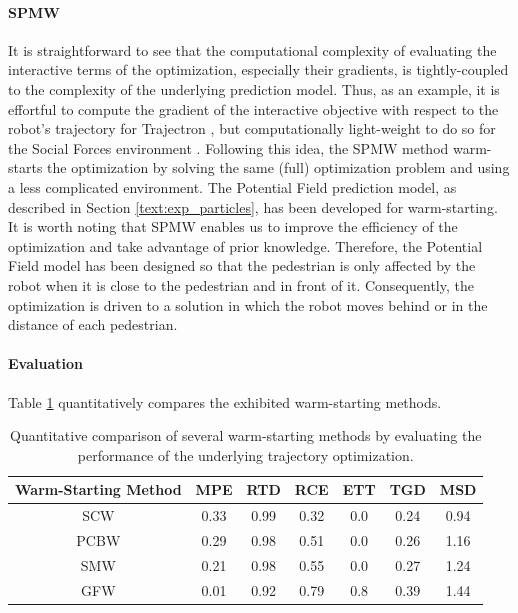 \paragraph{\ac{SPMW}}
It is straightforward to see that the computational complexity of evaluating the interactive terms of the optimization, especially their gradients, is tightly-coupled to the complexity of the underlying prediction model. 
Thus, as an example, it is effortful to compute the gradient of the interactive objective with respect to the robot's trajectory for Trajectron \cite{Ivanovic2018}, but computationally light-weight to do so for the Social Forces environment \cite{Helbing1995}. Following this idea, the \ac{SPMW} method warm-starts the optimization by solving the same (full) optimization problem and using a less complicated environment. The Potential Field prediction model, as described in Section \ref{text:exp_particles}, has been developed for warm-starting. It is worth noting that \ac{SPMW} enables us to improve the efficiency of the optimization and take advantage of prior knowledge. Therefore, the Potential Field model has been designed so that the pedestrian is only affected by the robot when it is close to the pedestrian and in front of it. Consequently, the optimization is driven to a solution in which the robot moves behind or in the distance of each pedestrian.

\paragraph{Evaluation}
Table \ref{table:warm_start} quantitatively compares the exhibited warm-starting methods. 

\begin{table}[!ht]
\begin{center}
\begin{tabular}{c|c|c|c|c|c|c}
\bf Warm-Starting Method & \bf MPE & \bf RTD & \bf RCE & \bf ETT & \bf TGD & \bf MSD \\
\hline
SCW & 0.33 & 0.99 & 0.32 & 0.0 & 0.24 & 0.94 \\
\hline
PCBW & 0.29 & 0.98 & 0.51 & 0.0 & 0.26 & 1.16 \\
\hline
SMW & 0.21 & 0.98 & 0.55 & 0.0 & 0.27 & 1.24 \\ 
\hline
\rowcolor{our_color}
GFW & 0.01 & 0.92 & 0.79 & 0.8 & 0.39 & 1.44 
\end{tabular}
\end{center}
\caption{Quantitative comparison of several warm-starting methods by evaluating the performance of the underlying trajectory optimization.}
\label{table:warm_start}
\end{table}

